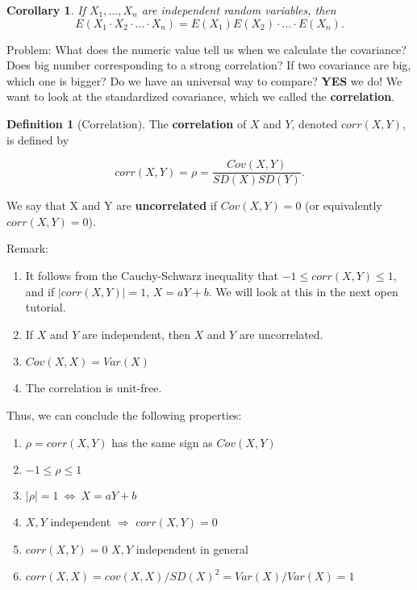 \documentclass[
]{book}
\providecommand{\tightlist}{%
  \setlength{\itemsep}{0pt}\setlength{\parskip}{0pt}}
\newtheorem{corollary}{Corollary}[chapter]
\theoremstyle{definition}
\newtheorem{definition}{Definition}[chapter]
\theoremstyle{definition}
\theoremstyle{definition}
\theoremstyle{definition}
\theoremstyle{remark}
\begin{document}
\begin{corollary}
If \(X_1,\dots,X_n\) are independent random variables, then
\[ E(X_1\cdot X_2 \cdot \dots \cdot X_n) = E(X_1) E(X_2)\cdot \dots \cdot E(X_n).\]
\end{corollary}

Problem: What does the numeric value tell us when we calculate the covariance? Does big number corresponding to a strong correlation? If two covariance are big, which one is bigger? Do we have an universal way to compare? \textbf{YES} we do! We want to look at the standardized covariance, which we called the \textbf{correlation}.

\begin{definition}[Correlation]
The \textbf{correlation} of \(X\) and \(Y\), denoted \(corr(X,Y)\), is defined by

\[
corr(X,Y) = \rho = \frac{Cov(X,Y)}{SD(X)SD(Y)}.
\]

We say that X and Y are \textbf{uncorrelated} if \(Cov(X,Y) = 0\) (or equivalently \(corr(X,Y)=0\)).
\end{definition}

Remark:

\begin{enumerate}
\def\labelenumi{\arabic{enumi}.}
\tightlist
\item
  It follows from the Cauchy-Schwarz inequality that \(-1 \le corr(X,Y) \le 1\), and if \(|corr(X,Y)|=1\), \(X=aY+b\). We will look at this in the next open tutorial.
\item
  If \(X\) and \(Y\) are independent, then \(X\) and \(Y\) are
  uncorrelated.
\item
  \(Cov(X,X)=Var(X)\)
\item
  The correlation is unit-free.
\end{enumerate}

Thus, we can conclude the following properties:

\begin{enumerate}
\def\labelenumi{\arabic{enumi}.}
\tightlist
\item
  \(\rho = corr(X,Y)\) has the same sign as \(Cov(X,Y)\)
\item
  \(-1 \leq \rho \leq 1\)
\item
  \(|\rho| = 1 \ \Leftrightarrow \ X = aY + b\)
\item
  \(X,Y\) independent \(\Rightarrow\) \(corr(X,Y) = 0\)
\item
  \(corr(X,Y)=0\) \red{$\not\Rightarrow$} \(X,Y\) independent in general
\item
  \(corr(X,X) = cov(X,X)/SD(X)^2 = Var(X)/Var(X) = 1\)
\end{enumerate}
\end{document}
